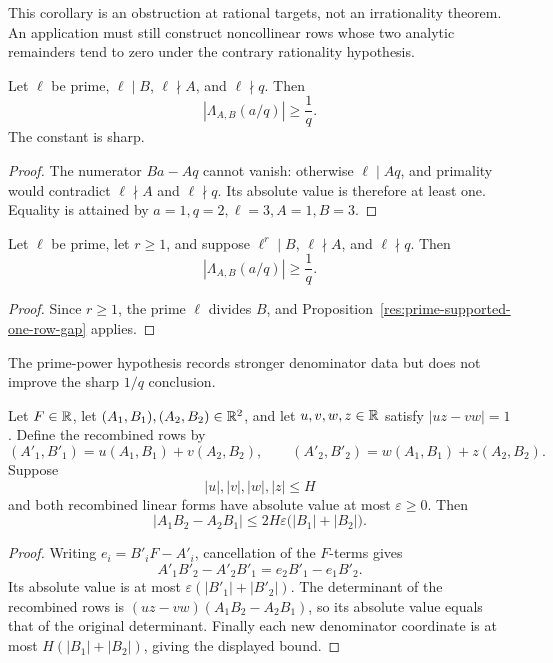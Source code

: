 \documentclass[11pt]{article}
\begin{document}
This corollary is an obstruction at rational targets, not an irrationality
theorem.  An application must still construct noncollinear rows whose two
analytic remainders tend to zero under the contrary rationality hypothesis.

\begin{proposition}
\label{res:prime-supported-one-row-gap}
Let \(\ell\) be prime, \(\ell\mid B\), \(\ell\nmid A\), and
\(\ell\nmid q\).  Then
\[
 \left|\Lambda_{A,B}(a/q)\right|\ge\frac1q .
\]
The constant is sharp.
\end{proposition}

\begin{proof}
The numerator \(Ba-Aq\) cannot vanish: otherwise \(\ell\mid Aq\), and
primality would contradict \(\ell\nmid A\) and \(\ell\nmid q\).  Its
absolute value is therefore at least one.  Equality is attained by
\(a=1,q=2,\ell=3,A=1,B=3\).
\end{proof}

\begin{corollary}
\label{res:prime-power-supported-one-row-gap}
Let \(\ell\) be prime, let \(r\ge1\), and suppose
\(\ell^r\mid B\), \(\ell\nmid A\), and \(\ell\nmid q\).  Then
\[
 \left|\Lambda_{A,B}(a/q)\right|\ge\frac1q .
\]
\end{corollary}

\begin{proof}
Since \(r\ge1\), the prime \(\ell\) divides \(B\), and
Proposition~\ref{res:prime-supported-one-row-gap} applies.
\end{proof}

The prime-power hypothesis records stronger denominator data but does not
improve the sharp \(1/q\) conclusion.

\begin{proposition}
\label{res:unit-determinant-height-decay}
Let \(F\in\mathbb{R}\), let \((A_1,B_1),(A_2,B_2)\in\mathbb{R}^2\), and let
\(u,v,w,z\in\mathbb{R}\) satisfy \(|uz-vw|=1\).  Define the recombined rows by
\[
 (A'_1,B'_1)=u(A_1,B_1)+v(A_2,B_2),\qquad
 (A'_2,B'_2)=w(A_1,B_1)+z(A_2,B_2).
\]
Suppose
\[
 |u|,|v|,|w|,|z|\le H
\]
and both recombined linear forms have absolute value at most
\(\varepsilon\ge0\).  Then
\[
 |A_1B_2-A_2B_1|
 \le 2H\varepsilon\bigl(|B_1|+|B_2|\bigr).
\]
\end{proposition}

\begin{proof}
Writing \(e_i=B'_iF-A'_i\), cancellation of the \(F\)-terms gives
\[
 A'_1B'_2-A'_2B'_1=e_2B'_1-e_1B'_2.
\]
Its absolute value is at most
\(\varepsilon(|B'_1|+|B'_2|)\).  The determinant of the recombined rows is
\((uz-vw)(A_1B_2-A_2B_1)\), so its absolute value equals that of the original
determinant.  Finally each new denominator coordinate is at most
\(H(|B_1|+|B_2|)\), giving the displayed bound.
\end{proof}
\end{document}
